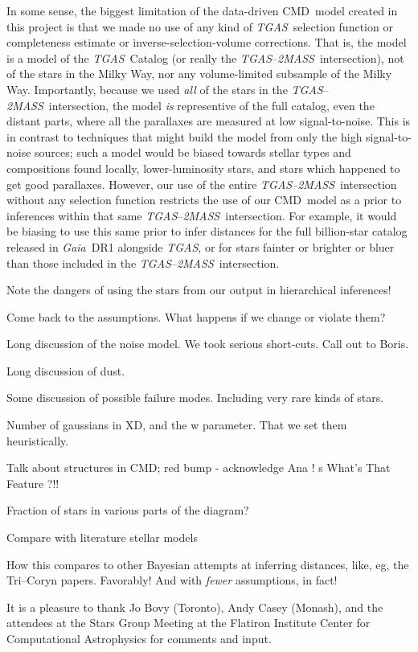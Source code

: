 \documentclass[modern]{aastex61}
\newcommand{\acronym}[1]{{\small{#1}}}
\newcommand{\project}[1]{\textsl{#1}}
\newcommand{\tgas}{\project{\acronym{TGAS}}}
\newcommand{\tmass}{\project{\acronym{2MASS}}}
\newcommand{\gaia}{\project{Gaia}}
\newcommand{\xd}{\acronym{XD}}
\newcommand{\cmd}{\acronym{CMD}}
\begin{document}
In some sense, the biggest limitation of the data-driven \cmd\ model
created in this project is that we made no use of any kind of \tgas\ selection
function or completeness estimate or inverse-selection-volume corrections.
That is, the model is a model of the \tgas\ Catalog
(or really the \tgas--\tmass\ intersection), not of the stars in
the Milky Way, nor any volume-limited subsample of the Milky Way.
Importantly, because we used \emph{all} of the stars in the \tgas--\tmass\
intersection, the model \emph{is} representive of the full catalog,
even the distant parts, where all the parallaxes are measured at low
signal-to-noise.
This is in contrast to techniques that might build the model from only
the high signal-to-noise sources; such a model would be biased towards
stellar types and compositions found locally, lower-luminosity stars,
and stars which happened to get good parallaxes.
However, our use of the entire \tgas--\tmass\ intersection without
any selection function restricts the use of our \cmd\ model as a prior
to inferences within that same \tgas--\tmass\ intersection.
For example, it would be biasing to use this same prior to infer
distances for the full billion-star catalog released in \gaia\ DR1
alongside \tgas, or for stars fainter or brighter or bluer than those
included in the \tgas--\tmass\ intersection.

Note the dangers of using the stars from our output in hierarchical inferences!

Come back to the assumptions. What happens if we change or violate them?

Long discussion of the noise model. We took serious short-cuts. Call out to Boris.

Long discussion of dust.

Some discussion of possible failure modes. Including very rare kinds of stars.

Number of gaussians in \xd, and the w parameter. That we set them heuristically.

Talk about structures in CMD; red bump - acknowledge Ana ! s
What's That Feature ?!!

Fraction of stars in various parts of the diagram?

Compare with literature stellar models

How this compares to other Bayesian attempts at inferring distances,
like, eg, the Tri--Coryn papers. Favorably! And with \emph{fewer}
assumptions, in fact!

\acknowledgments It is a pleasure to thank
  Jo Bovy (Toronto),
  Andy Casey (Monash),
and the attendees at the Stars Group Meeting at the Flatiron Institute
Center for Computational Astrophysics for comments and input.
\end{document}
